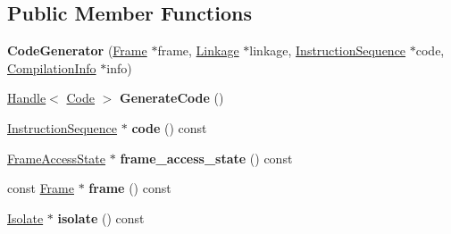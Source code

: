 \subsection*{Public Member Functions}
\begin{DoxyCompactItemize}
\item 
{\bfseries Code\+Generator} (\hyperlink{classv8_1_1internal_1_1compiler_1_1_frame}{Frame} $\ast$frame, \hyperlink{classv8_1_1internal_1_1compiler_1_1_linkage}{Linkage} $\ast$linkage, \hyperlink{classv8_1_1internal_1_1compiler_1_1_instruction_sequence}{Instruction\+Sequence} $\ast$code, \hyperlink{classv8_1_1internal_1_1_compilation_info}{Compilation\+Info} $\ast$info)\hypertarget{classv8_1_1internal_1_1compiler_1_1_code_generator_ac3fafd7bdcc3a89aaa51c7eebdf37375}{}\label{classv8_1_1internal_1_1compiler_1_1_code_generator_ac3fafd7bdcc3a89aaa51c7eebdf37375}

\item 
\hyperlink{classv8_1_1internal_1_1_handle}{Handle}$<$ \hyperlink{classv8_1_1internal_1_1_code}{Code} $>$ {\bfseries Generate\+Code} ()\hypertarget{classv8_1_1internal_1_1compiler_1_1_code_generator_a03ddce25945bbea1bb83c209938bba8f}{}\label{classv8_1_1internal_1_1compiler_1_1_code_generator_a03ddce25945bbea1bb83c209938bba8f}

\item 
\hyperlink{classv8_1_1internal_1_1compiler_1_1_instruction_sequence}{Instruction\+Sequence} $\ast$ {\bfseries code} () const \hypertarget{classv8_1_1internal_1_1compiler_1_1_code_generator_aab9aaac3e94b400822227863df436820}{}\label{classv8_1_1internal_1_1compiler_1_1_code_generator_aab9aaac3e94b400822227863df436820}

\item 
\hyperlink{classv8_1_1internal_1_1compiler_1_1_frame_access_state}{Frame\+Access\+State} $\ast$ {\bfseries frame\+\_\+access\+\_\+state} () const \hypertarget{classv8_1_1internal_1_1compiler_1_1_code_generator_a3e2e00d6d0f977c769563308768ae226}{}\label{classv8_1_1internal_1_1compiler_1_1_code_generator_a3e2e00d6d0f977c769563308768ae226}

\item 
const \hyperlink{classv8_1_1internal_1_1compiler_1_1_frame}{Frame} $\ast$ {\bfseries frame} () const \hypertarget{classv8_1_1internal_1_1compiler_1_1_code_generator_a62964c6abb1a563007e24b2b1f8bae3f}{}\label{classv8_1_1internal_1_1compiler_1_1_code_generator_a62964c6abb1a563007e24b2b1f8bae3f}

\item 
\hyperlink{classv8_1_1internal_1_1_isolate}{Isolate} $\ast$ {\bfseries isolate} () const \hypertarget{classv8_1_1internal_1_1compiler_1_1_code_generator_aea3b0e004be3e08cc8be590d790b8af3}{}\label{classv8_1_1internal_1_1compiler_1_1_code_generator_aea3b0e004be3e08cc8be590d790b8af3}


\end{DoxyCompactItemize}
